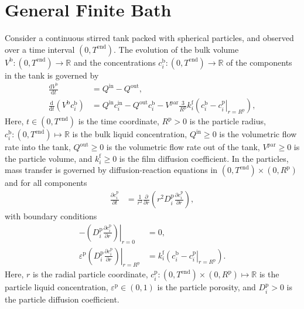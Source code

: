 \documentclass{article}
\begin{document}
\section*{General Finite Bath}
Consider a continuous stirred tank packed with spherical particles, and observed over a time interval $(0, T^{\mathrm{end}})$.
The evolution of the bulk volume $V^{\mathrm{b}}\colon (0, T^{\mathrm{end}}) \to \mathbb{R}$ and the concentrations $c^{\mathrm{b}}_{i}\colon (0, T^{\mathrm{end}}) \to \mathbb{R}$ of the components in the tank is governed by
\begin{align}
    \frac{\mathrm{d}V^{\mathrm{b}}}{\mathrm{d}t}
    &= Q^{\mathrm{in}}
        - Q^{\mathrm{out}},
    \\
    \frac{\mathrm{d}}{\mathrm{d} t} \left( V^{\mathrm{b}} c^{\mathrm{b}}_{i} \right)
    &= Q^{\mathrm{in}} c^{\mathrm{in}}_{i}
        - Q^{\mathrm{out}} c^{\mathrm{b}}_{i}
        - V^{\mathrm{par}} \frac{3}{R^{\mathrm{p}}} k^{\mathrm{f}}_{i} \left(c^{\mathrm{b}}_{i} - \left. c^{\mathrm{p}}_{i} \right|_{r = R^{\mathrm{p}}} \right),
\end{align}
Here, $t\in (0, T^{\mathrm{end}})$ is the time coordinate, $R^{\mathrm{p}}> 0$ is the particle radius, $c^{\mathrm{b}}_{i}\colon (0, T^{\mathrm{end}}) \mapsto \mathbb{R}$ is the bulk liquid concentration, $Q^{\mathrm{in}}\geq 0$ is the volumetric flow rate into the tank, $Q^{\mathrm{out}}\geq 0$ is the volumetric flow rate out of the tank, $V^{\mathrm{par}}\geq 0$ is the particle volume, and $k^{\mathrm{f}}_{i}\geq 0$ is the film diffusion coefficient.
In the particles, mass transfer is governed by diffusion-reaction equations in $(0, T^{\mathrm{end}})\times (0, R^{\mathrm{p}})$ and for all components
\begin{align}
    \frac{\partial c^{\mathrm{p}}_{i}}{\partial t}
    &= \frac{1}{r^{2}} \frac{\partial }{\partial r} \left( r^{2} D^{\mathrm{p}}_{i} \frac{\partial c^{\mathrm{p}}_{i}}{\partial r} \right),
\end{align}
with boundary conditions
\begin{align}
    - \left. \left( D^{\mathrm{p}}_{i} \frac{\partial c^{\mathrm{p}}_{i}}{\partial r} \right) \right|_{r=0}
    &= 0,
    \\
    \varepsilon^{\mathrm{p}} \left. \left( D^{\mathrm{p}}_{i} \frac{\partial c^{\mathrm{p}}_{i}}{\partial r} \right)\right|_{r = R^{\mathrm{p}}}
    &= k^{\mathrm{f}}_{i} \left. \left( c^{\mathrm{b}}_{i} - c^{\mathrm{p}}_{i} \right|_{r = R^{\mathrm{p}}} \right).
\end{align}
Here, $r$ is the radial particle coordinate, $c^{\mathrm{p}}_{i}\colon (0, T^{\mathrm{end}})\times (0, R^{\mathrm{p}}) \mapsto \mathbb{R}$ is the particle liquid concentration, $\varepsilon^{\mathrm{p}}\in (0, 1)$ is the particle porosity, and $D^{\mathrm{p}}_{i}> 0$ is the particle diffusion coefficient.
\end{document}
